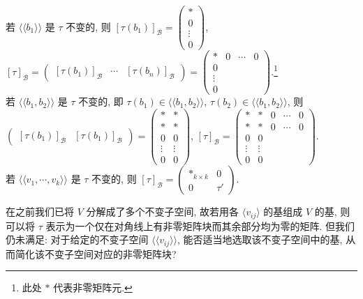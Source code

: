 \documentclass{note}
\begin{document}
\begin{eg}
    若 $\langle\langle b_1\rangle\rangle$ 是 $\tau$ 不变的, 则 $[\tau(b_1)]_{\mathcal{B}}=\begin{pmatrix}
        *\\
        0\\
        \vdots\\
        0
    \end{pmatrix}$, $[\tau]_{\mathcal{B}}=\begin{pmatrix}
        [\tau(b_1)]_{\mathcal{B}}&\cdots&[\tau(b_n)]_{\mathcal{B}}
    \end{pmatrix}=\begin{pmatrix}
        *&0&\cdots&0\\
        0\\
        \vdots\\
        0
    \end{pmatrix}$.\footnote{此处 $*$ 代表非零矩阵元.}\\
    若 $\langle\langle b_1,b_2\rangle\rangle$ 是 $\tau$ 不变的, 即 $\tau(b_1)\in\langle\langle b_1,b_2\rangle\rangle$, $\tau(b_2)\in\langle\langle b_1,b_2\rangle\rangle$, 则 $\begin{pmatrix}
        [\tau(b_1)]_{\mathcal{B}}&[\tau(b_1)]_{\mathcal{B}}
    \end{pmatrix}=\begin{pmatrix}
        *&*\\
        *&*\\
        0&0\\
        \vdots&\vdots\\
        0&0
    \end{pmatrix}$, $[\tau]_{\mathcal{B}}=\begin{pmatrix}
        *&*&0&\cdots&0\\
        *&*&0&\cdots&0\\
        0&0\\
        \vdots&\vdots\\
        0&0
    \end{pmatrix}$.\\
    若 $\langle\langle v_1,\cdots,v_k\rangle\rangle$ 是 $\tau$ 不变的, 则 $[\tau]_{\mathcal{B}}=\begin{pmatrix}
        *_{k\times k}&0\\
        0&\tau'
    \end{pmatrix}$.
\end{eg}

在之前我们已将 $V$ 分解成了多个不变子空间, 故若用各 $\langle v_{ij}\rangle$ 的基组成 $V$ 的基, 则可以将 $\tau$ 表示为一个仅在对角线上有非零矩阵块而其余部分均为零的矩阵. 但我们仍未满足: 对于给定的不变子空间 $\langle\langle v_{ij}\rangle\rangle$, 能否适当地选取该不变子空间中的基, 从而简化该不变子空间对应的非零矩阵块?
\end{document}
